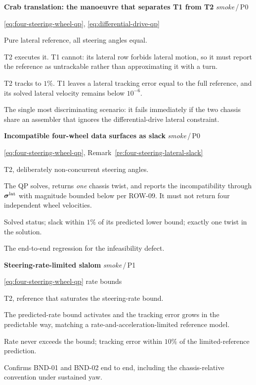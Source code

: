 \documentclass[10pt]{article}
\newcommand{\slackVariable}{\bs{\sigma}}
\newenvironment{testcard}[4]{%
  \par\medskip\noindent
  \tBlock{#1}\quad\textbf{#2}%
  \hfill{\small\textit{#3}\,/\,#4}\par\nopagebreak\vspace{2pt}
  \begin{description}[leftmargin=7.5em,style=sameline,itemsep=1pt,topsep=1pt]
}{%
  \end{description}\par\medskip
}
\begin{document}
\begin{testcard}{SMK-06}{Crab translation: the manoeuvre that separates T1 from T2}{smoke}{P0}
  \item[Targets] \eqref{eq:four-steering-wheel-qp},
    \eqref{eq:differential-drive-qp}
  \item[Regime] Pure lateral reference, all steering angles equal.
  \item[Invariant] T2 executes it. T1 cannot: its lateral row forbids lateral
    motion, so it must report the reference as untrackable rather than
    approximating it with a turn.
  \item[Pass] T2 tracks to $1\%$. T1 leaves a lateral tracking error equal to
    the full reference, and its solved lateral velocity remains below
    $10^{-6}$\unitVelTS.
  \item[Diagnosis] The single most discriminating scenario: it fails
    immediately if the two chassis share an assembler that ignores the
    differential-drive lateral constraint.
\end{testcard}

\begin{testcard}{SMK-07}{Incompatible four-wheel data surfaces as slack}{smoke}{P0}
  \item[Targets] \eqref{eq:four-steering-wheel-qp},
    Remark~\ref{re:four-steering-lateral-slack}
  \item[Regime] T2, deliberately non-concurrent steering angles.
  \item[Invariant] The QP solves, returns \emph{one} chassis twist, and reports
    the incompatibility through $\slackVariable^{\text{lat}}$ with magnitude
    bounded below per ROW-09. It must not return four independent wheel
    velocities.
  \item[Pass] Solved status; slack within $1\%$ of its predicted lower bound;
    exactly one twist in the solution.
  \item[Diagnosis] The end-to-end regression for the infeasibility defect.
\end{testcard}

\begin{testcard}{SMK-08}{Steering-rate-limited slalom}{smoke}{P1}
  \item[Targets] \eqref{eq:four-steering-wheel-qp} rate bounds
  \item[Regime] T2, reference that saturates the steering-rate bound.
  \item[Invariant] The predicted-rate bound activates and the tracking error
    grows in the predictable way, matching a rate-and-acceleration-limited
    reference model.
  \item[Pass] Rate never exceeds the bound; tracking error within $10\%$ of the
    limited-reference prediction.
  \item[Diagnosis] Confirms BND-01 and BND-02 end to end, including the
    chassis-relative convention under sustained yaw.
\end{testcard}
\end{document}
